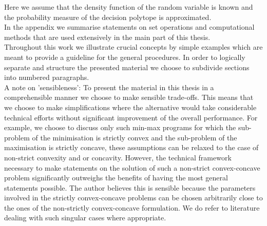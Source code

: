 %
Here we assume that the density function of the random variable is known and the probability measure of the decision polytope is approximated.
%
\\[1em]
%
In the appendix we summarise statements on set operations and computational methods that are used extensively in the main part of this thesis.
%
\\[2em]
%
Throughout this work we illustrate crucial concepts by simple examples which are meant to provide a guideline for the general procedures.
%
In order to logically separate and structure the presented material we choose to subdivide sections into numbered paragraphs.
%
\\[1em]
%
A note on 'sensibleness': To present the material in this thesis in a comprehensible manner we choose to make sensible trade-offs.
%
This means that we choose to make simplifications where the alternative would take considerable technical efforts without significant improvement of the overall performance.
%
For example, we choose to discuss only such min-max programs for which the sub-problem of the minimisation is strictly convex and the sub-problem of the maximisation is strictly concave, these assumptions can be relaxed to the case of non-strict convexity and or concavity.
%
However, the technical framework necessary to make statements on the solution of such a non-strict convex-concave problem significantly outweighs the benefits of having the most general statements possible.
%
The author believes this is sensible because the parameters involved in the strictly convex-concave problems can be chosen arbitrarily close to the ones of the non-strictly convex-concave formulation.
%
We do refer to literature dealing with such singular cases where appropriate.